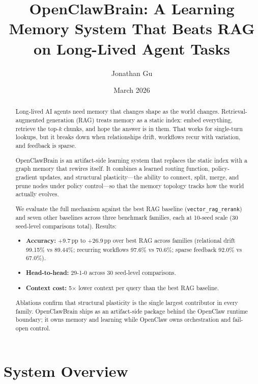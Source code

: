 \documentclass[11pt]{article}
\title{OpenClawBrain: A Learning Memory System That Beats RAG on Long-Lived Agent Tasks}
\author{Jonathan Gu}
\date{March 2026}
\begin{document}
\maketitle

\begin{abstract}
Long-lived AI agents need memory that changes shape as the world changes.
Retrieval-augmented generation (RAG) treats memory as a static index:
embed everything, retrieve the top-$k$ chunks, and hope the answer is in them.
That works for single-turn lookups, but it breaks down when relationships drift,
workflows recur with variation, and feedback is sparse.

OpenClawBrain is an artifact-side learning system that replaces the static index
with a graph memory that rewires itself.
It combines a learned routing function, policy-gradient updates, and structural
plasticity---the ability to connect, split, merge, and prune nodes under policy
control---so that the memory topology tracks how the world actually evolves.

We evaluate the full mechanism against the best RAG baseline
(\texttt{vector\_rag\_rerank}) and seven other baselines across three benchmark
families, each at 10-seed scale (30 seed-level comparisons total).
Results:
\begin{itemize}
  \item \textbf{Accuracy:} +9.7\,pp to +26.9\,pp over best RAG across families
        (relational drift 99.15\% vs 89.44\%;
         recurring workflows 97.6\% vs 70.6\%;
         sparse feedback 92.0\% vs 67.0\%).
  \item \textbf{Head-to-head:} 29-1-0 across 30 seed-level comparisons.
  \item \textbf{Context cost:} 5$\times$ lower context per query than the best RAG baseline.
\end{itemize}

Ablations confirm that structural plasticity is the single largest contributor
in every family.
OpenClawBrain ships as an artifact-side package behind the OpenClaw runtime
boundary; it owns memory and learning while OpenClaw owns orchestration and
fail-open control.
\end{abstract}

\section{System Overview}
\label{sec:overview}
\end{document}
